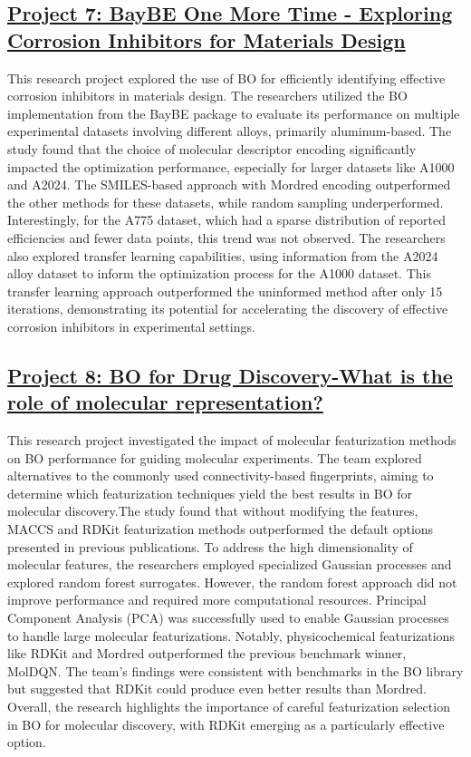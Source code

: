  \subsection*{\href{https://www.youtube.com/watch?v=kIRxGdwmLSY}{Project 7: BayBE One More Time - Exploring Corrosion Inhibitors for Materials Design}}

This research project explored the use of BO for efficiently identifying effective corrosion inhibitors in materials design. The researchers utilized the BO implementation from the BayBE package\cite{fitzner2022baybe} to evaluate its performance on multiple experimental datasets\cite{galvao2022cordata} involving different alloys, primarily aluminum-based. The study found that the choice of molecular descriptor encoding significantly impacted the optimization performance, especially for larger datasets like A1000 and A2024. The SMILES-based approach with Mordred encoding\cite{moriwaki2018mordred} outperformed the other methods for these datasets, while random sampling underperformed. Interestingly, for the A775 dataset, which had a sparse distribution of reported efficiencies and fewer data points, this trend was not observed. The researchers also explored transfer learning capabilities, using information from the A2024 alloy dataset to inform the optimization process for the A1000 dataset. This transfer learning approach outperformed the uninformed method after only 15 iterations, demonstrating its potential for accelerating the discovery of effective corrosion inhibitors in experimental settings.
 \subsection*{\href{https://www.youtube.com/watch?v=5f_UwsfYrc8}{Project 8: BO for Drug Discovery-What is the role of molecular representation?}}

This research project investigated the impact of molecular featurization methods on BO performance for guiding molecular experiments. The team explored alternatives to the commonly used connectivity-based fingerprints, aiming to determine which featurization techniques yield the best results in BO for molecular discovery.The study found that without modifying the features, MACCS\cite{durant2002reoptimization} and RDKit\cite{landrum2013rdkit} featurization methods outperformed the default options presented in previous publications. To address the high dimensionality of molecular features, the researchers employed specialized Gaussian processes and explored random forest surrogates. However, the random forest approach did not improve performance and required more computational resources. Principal Component Analysis (PCA) was successfully used to enable Gaussian processes to handle large molecular featurizations. Notably, physicochemical featurizations like RDKit and Mordred\cite{moriwaki2018mordred} outperformed the previous benchmark winner, MolDQN\cite{zhou2019optimization}. The team's findings were consistent with benchmarks in the BO library but suggested that RDKit could produce even better results than Mordred. Overall, the research highlights the importance of careful featurization selection in BO for molecular discovery, with RDKit emerging as a particularly effective option.
